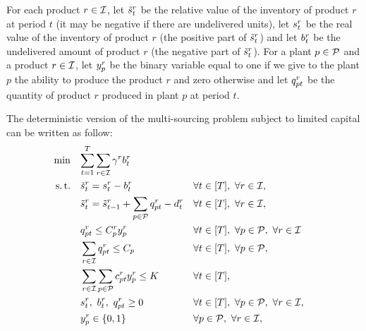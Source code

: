 For each product $r\in\mathcal{I}$, let $\tilde{s}_t^r$ be the relative value of the inventory of product $r$ at period $t$ (\ie it may be negative if there are undelivered units), let $s_t^r$ be the real value of the inventory of product $r$ (\ie the positive part of $\tilde{s}_t^r$) and let $b_t^r$ be the undelivered amount of product $r$ (\ie the negative part of $\tilde{s}_t^r$). For a plant $p\in\mathcal{P}$ and a product $r\in\mathcal{I}$, let $y_p^r$ be the binary variable equal to one if we give to the plant $p$ the ability to produce the product $r$ and zero otherwise and let $q_{pt}^r$ be the quantity of product $r$ produced in plant $p$ at period $t$.

The deterministic version of the multi-sourcing problem subject to limited capital can be written as follow:
\begin{subequations}\label{eq:multi-sourcing - limited capital}
  \begin{align}
    \min\quad & \rlap{$\ds \sum_{t=1}^{\horizon} \sum_{r\in\REF} \backorder^r \backlog_t^r$}
    \label{eq:multi-sourcing - limited capital - objective}
    \\
    \st\quad & \ds \level_t^r = \inventory_t^r - \backlog_t^r && \forall t\in\range{\horizon},\ \forall r\in\REF,
    \label{eq:multi-sourcing - limited capital - inventory}
    \\
    & \ds \level_t^r = \level_{t-1}^r + \sum_{p\in\plants}\quantity_{pt}^r - \demand_t^r && \forall t\in\range{\horizon},\ \forall r\in\REF,
    \label{eq:multi-sourcing - limited capital - dynamic}
    \\
    & \ds \quantity_{pt}^r \le \capacity_p^r \open_p^r && \forall t\in\range{\horizon},\ \forall p\in\plants,\ \forall r\in\REF
    \label{eq:multi-sourcing - limited capital - big M}
    \\
    & \ds \sum_{r\in\REF}\quantity_{pt}^r \le \capacity_p && \forall t\in\range{\horizon},\ \forall p\in\plants,
    \label{eq:multi-sourcing - limited capital - capacity}
    \\
    & \ds \sum_{r\in\REF} \sum_{p\in\plants}\affect_{pt}^r\open_p^r \le \capital && \forall t\in\range{\horizon},
    \label{eq:multi-sourcing - limited capital - capital}
    \\
    & \ds \inventory_t^r,\ \backlog_t^r,\ \quantity_{pt}^r \ge 0 && \forall t\in\range{\horizon},\ \forall p\in\plants,\ \forall r\in\REF,
    \label{eq:multi-sourcing - limited capital - nonnegativity}
    \\
    & \ds \open_p^r \in \crbracket{0,1} && \forall p\in\plants,\ \forall r\in\REF,
    \label{eq:multi-sourcing - limited capital - binary}
  \end{align}
\end{subequations}


